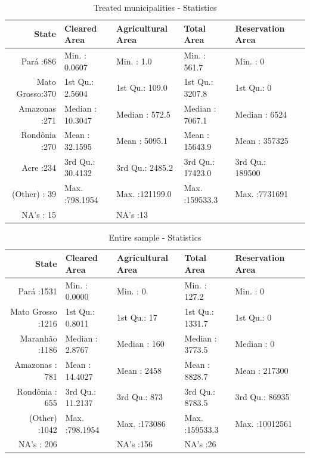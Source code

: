 \documentclass[11pt, oneside]{article}   	%
\begin{document}
\begin{table}[!ht]
\hskip-1.2cm\begin{tabular}{rlllll}
  \hline
 State &     Cleared Area & Agricultural Area &  Total Area & Reservation Area \\ 
  \hline
  Pará       :686   & Min.   :  0.0607   & Min.   :     1.0   & Min.   :   561.7   & Min.   :      0   \\ 
  Mato Grosso:370   & 1st Qu.:  2.5604   & 1st Qu.:   109.0   & 1st Qu.:  3207.8   & 1st Qu.:      0   \\ 
  Amazonas   :271   & Median : 10.3047   & Median :   572.5   & Median :  7067.1   & Median :   6524   \\ 
  Rondônia   :270   & Mean   : 32.1595   & Mean   :  5095.1   & Mean   : 15643.9   & Mean   : 357325   \\ 
  Acre       :234   & 3rd Qu.: 30.4132   & 3rd Qu.:  2485.2   & 3rd Qu.: 17423.0   & 3rd Qu.: 189500   \\ 
  (Other)    : 39   & Max.   :798.1954   & Max.   :121199.0   & Max.   :159533.3   & Max.   :7731691   \\ 
  NA's       : 15   &  & NA's   :13   &  &  \\ 
   \hline
\end{tabular}
\caption{Treated municipalities - Statistics} 
\end{table}




\begin{table}[!h]
\hskip-1.2cm\begin{tabular}{rlllll}
  \hline
  State &     Cleared Area & Agricultural Area &  Total Area & Reservation Area \\ 
  \hline
  Pará       :1531   & Min.   :  0.0000   & Min.   :     0   & Min.   :   127.2   & Min.   :       0   \\ 
  Mato Grosso :1216   & 1st Qu.:  0.8011   & 1st Qu.:    17   & 1st Qu.:  1331.7   & 1st Qu.:       0   \\ 
  Maranhão   :1186   & Median :  2.8767   & Median :   160   & Median :  3773.5   & Median :       0   \\ 
  Amazonas   : 781   & Mean   : 14.4027   & Mean   :  2458   & Mean   :  8828.7   & Mean   :  217300   \\ 
  Rondônia   : 655   & 3rd Qu.: 11.2137   & 3rd Qu.:   873   & 3rd Qu.:  8783.5   & 3rd Qu.:   86935   \\ 
  (Other)    :1042   & Max.   :798.1954   & Max.   :173086   & Max.   :159533.3   & Max.   :10012561   \\ 
  NA's       : 206   &  & NA's   :156   & NA's   :26   &  \\ 
   \hline
\end{tabular}
\caption{Entire sample - Statistics} 
\end{table}
\end{document}
